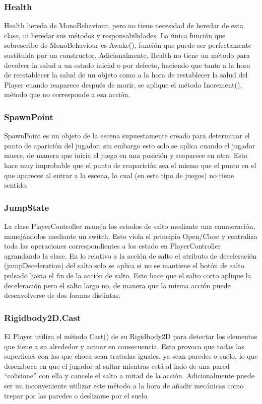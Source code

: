\subsubsection{Health}
Health hereda de MonoBehaviour, pero no tiene necesidad de heredar de esta clase, ni heredar sus métodos y responsabilidades. La única función que sobrescribe de MonoBehaviour es Awake(), función que puede ser perfectamente sustituida por un constructor. Adicionalmente, Health no tiene un método para devolver la salud a un estado inicial o por defecto, haciendo que tanto a la hora de reestablecer la salud de un objeto como a la hora de restablecer la salud del Player cuando reaparece después de morir, se aplique el método Increment(), método que no corresponde a esa acción.

\subsubsection{SpawnPoint}
SpawnPoint es un objeto de la escena supuestamente creado para determinar el punto de aparición del jugador, sin embargo esto solo se aplica cuando el jugador muere, de manera que inicia el juego en una posición y reaparece en otra. Esto hace muy improbable que el punto de reaparición sea el mismo que el punto en el que apareces al entrar a la escena, lo cual (en este tipo de juegos) no tiene sentido.

\subsubsection{JumpState}
La clase PlayerController maneja los estados de salto mediante una enumeración, manejándolos mediante un switch. Esto viola el principio Open/Close y centraliza toda las operaciones correspondientes a los estado en PlayerController agrandando la clase. 
En lo relativo a la acción de salto el atributo de deceleración (jumpDeceleration) del salto solo se aplica si no se mantiene el botón de salto pulsado hasta el fin de la acción de salto. Esto hace que el salto corto aplique la deceleración pero el salto largo no, de manera que la misma acción puede desenvolverse de dos formas distintas. 

\subsubsection{Rigidbody2D.Cast}
El Player utiliza el método Cast() de su Rigidbody2D para detectar los elementos que tiene a su alrededor y actuar en consecuencia. Esto provoca que todas las superficies con las que choca sean tratadas iguales, ya sean paredes o suelo, lo que desemboca en que el jugador al saltar mientras está al lado de una pared “colisione” con ella y cancele el salto a mitad de la acción. Adicionalmente puede ser un inconveniente utilizar este método a la hora de añadir mecánicas como trepar por las paredes o deslizarse por el suelo. 

